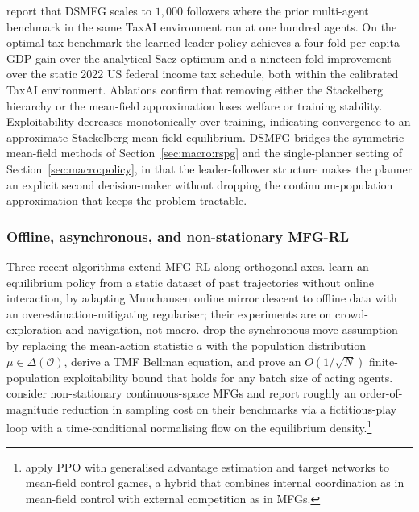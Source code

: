 \citet{Mi2025dsmfg} report that DSMFG scales to $1{,}000$ followers
where the prior multi-agent benchmark in the same TaxAI environment
\citep{Mi2024taxai} ran at one hundred agents. On the optimal-tax
benchmark the learned leader policy achieves a four-fold per-capita
GDP gain over the analytical Saez optimum \citep{Saez2001} and a
nineteen-fold improvement over the static 2022 US federal income tax
schedule, both within the calibrated TaxAI environment. Ablations
confirm that removing either the Stackelberg hierarchy or the
mean-field approximation loses welfare or training stability.
Exploitability decreases monotonically over training, indicating
convergence to an approximate Stackelberg mean-field equilibrium.
DSMFG bridges the symmetric mean-field methods of
Section~\ref{sec:macro:rspg} and the single-planner setting of
Section~\ref{sec:macro:policy}, in that the leader-follower
structure makes the planner an explicit second decision-maker
without dropping the continuum-population approximation that keeps
the problem tractable.

\subsubsection{Offline, asynchronous, and non-stationary MFG-RL}
\label{sec:macro:other-mfg-rl}

Three recent algorithms extend MFG-RL along orthogonal axes.
\citet{Brunnbauer2024offmmd} learn an equilibrium policy from a
static dataset of past trajectories without online interaction, by
adapting Munchausen online mirror descent to offline data with an
overestimation-mitigating regulariser; their experiments are on
crowd-exploration and navigation, not macro.
\citet{YangShan2026tmf} drop the synchronous-move assumption by
replacing the mean-action statistic $\bar a$ with the population
distribution $\mu \in \Delta(\mathcal O)$, derive a TMF Bellman
equation, and prove an $O(1/\sqrt{N})$ finite-population
exploitability bound that holds for any batch size of acting agents.
\citet{Magnino2025nonstationary} consider non-stationary
continuous-space MFGs and report roughly an order-of-magnitude
reduction in sampling cost on their benchmarks via a fictitious-play
loop with a time-conditional normalising flow on the equilibrium
density.\footnote{\citet{Peng2025mfcg} apply PPO with generalised
advantage estimation and target networks to mean-field control
games, a hybrid that combines internal coordination as in mean-field
control with external competition as in MFGs.}

